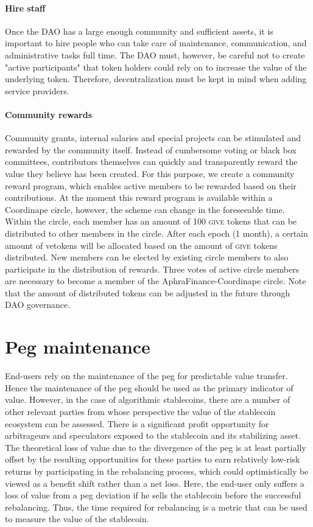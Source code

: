 \paragraph{\textbf{Hire staff}}
Once the DAO has a large enough community and sufficient assets, it is important to hire people who can take care of maintenance, communication, and administrative tasks full time.
The DAO must, however, be careful not to create "active participants" that token holders could rely on to increase the value of the underlying token. 
Therefore, decentralization must be kept in mind when adding service providers. 

\paragraph{\textbf{Community rewards}}
Community grants, internal salaries and special projects can be stimulated and rewarded by the community itself. 
Instead of cumbersome voting or black box committees, contributors themselves can quickly and transparently reward the value they believe has been created.
For this purpose, we create a community reward program, which enables active members to be rewarded based on their contributions.
At the moment this reward program is available within a Coordinape circle, however, the scheme can change in the foreseeable time.\cite{coordinape}
Within the circle, each member has an amount of 100 \textsc{give} tokens that can be distributed to other members in the circle.
After each epoch (1 month), a certain amount of ve\aphra tokens will be allocated based on the amount of \textsc{give} tokens distributed.
New members can be elected by existing circle members to also participate in the distribution of rewards.
Three votes of active circle members are necessary to become a member of the AphraFinance-Coordinape circle.
Note that the amount of distributed \aphra tokens can be adjusted in the future through DAO governance.

\section{Peg maintenance}
\label{sec:peg_maintenance}
End-users rely on the maintenance of the peg for predictable value transfer. 
Hence the maintenance of the peg should be used as the primary indicator of value.
However, in the case of algorithmic stablecoins, there are a number of other relevant parties from whose perspective the value of the stablecoin ecosystem can be assessed.
There is a significant profit opportunity for arbitrageurs and speculators exposed to the stablecoin and its stabilizing asset.
The theoretical loss of value due to the divergence of the peg is at least partially offset by the resulting opportunities for these parties to earn relatively low-risk returns by participating in the rebalancing process, which could optimistically be viewed as a benefit shift rather than a net loss.
Here, the end-user only suffers a loss of value from a peg deviation if he sells the stablecoin before the successful rebalancing.
Thus, the time required for rebalancing is a metric that can be used to measure the value of the stablecoin.\\[-1em]


